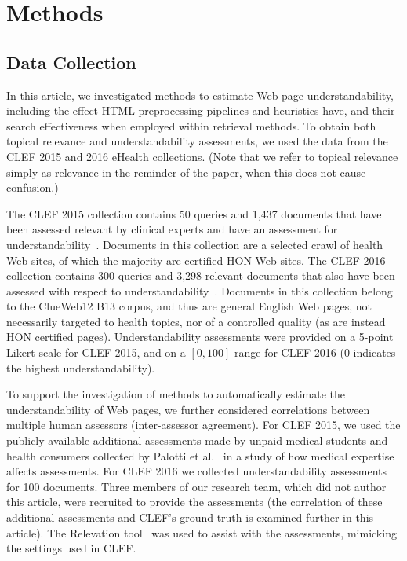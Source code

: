 \section*{Methods}
\label{sec:data}

\subsection{Data Collection}

In this article, we investigated methods to estimate Web page understandability, including the effect HTML preprocessing pipelines and heuristics have, and their search effectiveness when employed within retrieval methods. To obtain both topical relevance and  understandability assessments, we used the data from the CLEF 2015 and 2016 eHealth collections. (Note that we refer to topical relevance simply as relevance in the reminder of the paper, when this does not cause confusion.)

The CLEF 2015 collection contains 50 queries and 1,437 documents that have been assessed relevant by clinical experts and have an assessment for understandability~\cite{clef15}. Documents in this collection are a selected crawl of health Web sites, of which the majority are certified HON Web sites.
The CLEF 2016 collection contains 300 queries and 3,298 relevant documents that also have been assessed with respect to understandability~\cite{clef16}. Documents in this collection belong to the ClueWeb12 B13 corpus, and thus are general English Web pages, not necessarily targeted to health topics, nor of a controlled quality (as are instead HON certified pages). 
Understandability assessments were provided on a 5-point Likert scale for CLEF 2015, and on a $[0,100]$ range for CLEF 2016 (0 indicates the highest understandability). 

To support the investigation of methods to automatically estimate the understandability of Web pages, 
we further considered correlations between multiple human assessors (inter-assessor agreement). For CLEF 2015, we used the publicly available additional assessments made by unpaid medical students and health consumers collected by Palotti et al.~\cite{palotti16b} in a study of how medical expertise affects assessments. For CLEF 2016 we  collected understandability assessments for 100 documents. 
Three members of our research team, which did not author this article, were recruited to provide the assessments (the correlation of these additional assessments and CLEF's ground-truth is examined further in this article).
The Relevation tool~\cite{koopman14} was used to assist with the assessments, mimicking the settings used in CLEF. %


